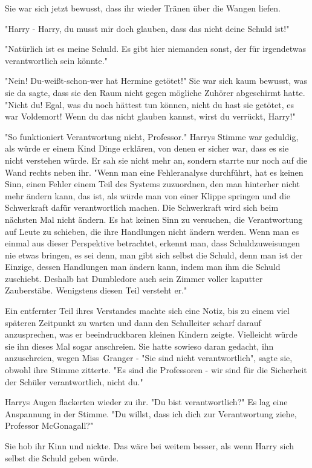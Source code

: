 {Sie war sich jetzt bewusst, dass ihr wieder Tränen über die Wangen liefen.

"Harry - Harry, du musst mir doch glauben, dass das nicht deine Schuld ist!"

"Natürlich ist es meine Schuld. Es gibt hier niemanden sonst, der für irgendetwas verantwortlich sein könnte."

"Nein! Du-weißt-schon-wer hat Hermine getötet!" Sie war sich kaum bewusst, was sie da sagte, dass sie den Raum nicht gegen mögliche Zuhörer abgeschirmt hatte. "Nicht du! Egal, was du noch hättest tun können, nicht du hast sie getötet, es war Voldemort! Wenn du das nicht glauben kannst, wirst du verrückt, Harry!"

"So funktioniert Verantwortung nicht, Professor." Harrys Stimme war geduldig, als würde er einem Kind Dinge erklären, von denen er sicher war, dass es sie nicht verstehen würde. Er sah sie nicht mehr an, sondern starrte nur noch auf die Wand rechts neben ihr. "Wenn man eine Fehleranalyse durchführt, hat es keinen Sinn, einen Fehler einem Teil des Systems zuzuordnen, den man hinterher nicht mehr ändern kann, das ist, als würde man von einer Klippe springen und die Schwerkraft dafür verantwortlich machen. Die Schwerkraft wird sich beim nächsten Mal nicht ändern. Es hat keinen Sinn zu versuchen, die Verantwortung auf Leute zu schieben, die ihre Handlungen nicht ändern werden. Wenn man es einmal aus dieser Perspektive betrachtet, erkennt man, dass Schuldzuweisungen nie etwas bringen, es sei denn, man gibt sich selbst die Schuld, denn man ist der Einzige, dessen Handlungen man ändern kann, indem man ihm die Schuld zuschiebt. Deshalb hat Dumbledore auch sein Zimmer voller kaputter Zauberstäbe. Wenigstens diesen Teil versteht er."

Ein entfernter Teil ihres Verstandes machte sich eine Notiz, bis zu einem viel späteren Zeitpunkt zu warten und dann den Schulleiter scharf darauf anzusprechen, was er beeindruckbaren kleinen Kindern zeigte. Vielleicht würde sie ihn dieses Mal sogar anschreien. Sie hatte sowieso daran gedacht, ihn anzuschreien, wegen Miss~Granger - "Sie sind nicht verantwortlich", sagte sie, obwohl ihre Stimme zitterte. "Es sind die Professoren - wir sind für die Sicherheit der Schüler verantwortlich, nicht du."

Harrys Augen flackerten wieder zu ihr. "Du bist verantwortlich?" Es lag eine Anspannung in der Stimme. "Du willst, dass ich dich zur Verantwortung ziehe, Professor McGonagall?"

Sie hob ihr Kinn und nickte. Das wäre bei weitem besser, als wenn Harry sich selbst die Schuld geben würde.

}
